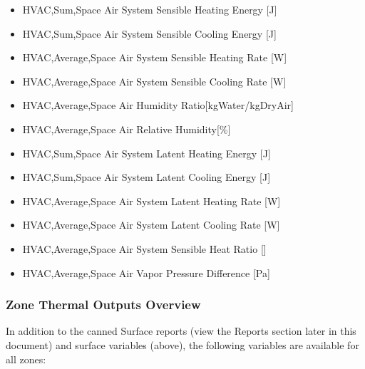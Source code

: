 \begin{itemize}
\item
  HVAC,Sum,Space Air System Sensible Heating Energy {[}J{]}
\item
  HVAC,Sum,Space Air System Sensible Cooling Energy {[}J{]}
\item
  HVAC,Average,Space Air System Sensible Heating Rate {[}W{]}
\item
  HVAC,Average,Space Air System Sensible Cooling Rate {[}W{]}
\item
  HVAC,Average,Space Air Humidity Ratio{[}kgWater/kgDryAir{]}
\item
  HVAC,Average,Space Air Relative Humidity{[}\%{]}
\item
  HVAC,Sum,Space Air System Latent Heating Energy {[}J{]}
\item
  HVAC,Sum,Space Air System Latent Cooling Energy {[}J{]}
\item
  HVAC,Average,Space Air System Latent Heating Rate {[}W{]}
\item
  HVAC,Average,Space Air System Latent Cooling Rate {[}W{]}
\item
  HVAC,Average,Space Air System Sensible Heat Ratio {[}{]}
\item
  HVAC,Average,Space Air Vapor Pressure Difference {[}Pa{]}
\end{itemize}

\subsubsection{Zone Thermal Outputs Overview}\label{zone-thermal-outputs}

In addition to the canned Surface reports (view the Reports section later in this document) and surface variables (above), the following variables are available for all zones:

